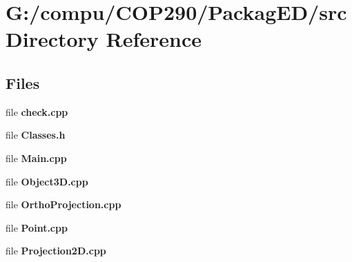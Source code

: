\section{G\+:/compu/\+C\+O\+P290/\+Packag\+E\+D/src Directory Reference}
\label{dir_ac0f5cd994b22561def627378d67d54a}
\subsection*{Files}
\begin{DoxyCompactItemize}
\item 
file \textbf{ check.\+cpp}
\item 
file \textbf{ Classes.\+h}
\item 
file \textbf{ Main.\+cpp}
\item 
file \textbf{ Object3\+D.\+cpp}
\item 
file \textbf{ Ortho\+Projection.\+cpp}
\item 
file \textbf{ Point.\+cpp}
\item 
file \textbf{ Projection2\+D.\+cpp}
\end{DoxyCompactItemize}
